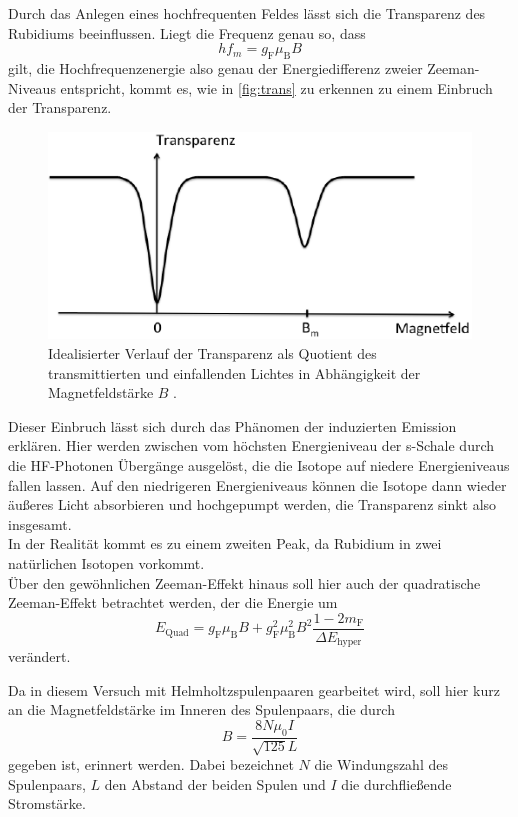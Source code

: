 Durch das Anlegen eines hochfrequenten Feldes lässt sich die Transparenz des Rubidiums beeinflussen.
Liegt die Frequenz genau so, dass
\begin{equation}
    h f_m = g_\text{F} \mu_\text{B} B
    \label{eq:HFFeld}
\end{equation}
gilt, die Hochfrequenzenergie also genau der Energiedifferenz zweier Zeeman-Niveaus entspricht, kommt es, wie in \autoref{fig:trans} zu erkennen zu einem Einbruch der Transparenz.
\begin{figure}[H]
    \centering
    \includegraphics{figures/Transparenz.pdf}
    \caption{Idealisierter Verlauf der Transparenz als Quotient des transmittierten und einfallenden Lichtes in Abhängigkeit der Magnetfeldstärke $B$ \cite{v21}.}
    \label{fig:trans}
\end{figure}
Dieser Einbruch lässt sich durch das Phänomen der induzierten Emission erklären.
Hier werden zwischen vom höchsten Energieniveau der s-Schale durch die HF-Photonen Übergänge ausgelöst, die die Isotope auf niedere Energieniveaus fallen lassen.
Auf den niedrigeren Energieniveaus können die Isotope dann wieder äußeres Licht absorbieren und hochgepumpt werden, die Transparenz sinkt also insgesamt.\\

In der Realität kommt es zu einem zweiten Peak, da Rubidium in zwei natürlichen Isotopen vorkommt.\\

Über den gewöhnlichen Zeeman-Effekt hinaus soll hier auch der quadratische Zeeman-Effekt betrachtet werden, der die Energie um
\begin{equation}
    E_\text{Quad} = g_\text{F} \mu_\text{B} B + g^2_\text{F} \mu^2_\text{B} B^2 \frac{1 - 2 m_\text{F}}{\Delta E_\text{hyper}}
    \label{eq:QuadZee}
\end{equation}
verändert.

Da in diesem Versuch mit Helmholtzspulenpaaren gearbeitet wird, soll hier kurz an die Magnetfeldstärke im Inneren des Spulenpaars, die durch
\begin{equation}
    B = \frac{8 N \mu_0 I}{\sqrt{125} L} 
    \label{eq:Magnetfeld_Helmholtz}
\end{equation}
gegeben ist, erinnert werden.
Dabei bezeichnet $N$ die Windungszahl des Spulenpaars, $L$ den Abstand der beiden Spulen und $I$ die durchfließende Stromstärke.